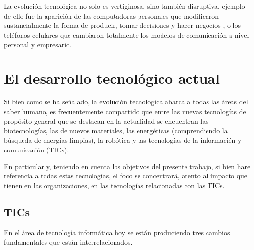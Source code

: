 \documentclass[a4paper, 12pt]{article}
\begin{document}
La evolución tecnológica no solo es vertiginosa, sino también disruptiva, ejemplo de ello fue la aparición de las computadoras personales que modificaron sustancialmente la forma de producir, tomar decisiones y hacer negocios , o los teléfonos celulares que cambiaron totalmente los modelos de comunicación a nivel personal y empresario.

\section{El desarrollo tecnológico actual}
\label{sec:DesarrolloTecnologicoActual}
Si bien como se ha señalado, la evolución tecnológica abarca a todas las áreas del saber humano, es frecuentemente compartido que entre las nuevas tecnologías de propósito general que se destacan en la actualidad se encuentran las biotecnologías, las de nuevos materiales, las energéticas (comprendiendo la búsqueda de energías limpias), la robótica y las tecnologías de la información y comunicación (TICs).

En particular y, teniendo en cuenta los objetivos del presente trabajo, si bien hare referencia a todas estas tecnologías, el foco se concentrará, atento al impacto que tienen en las organizaciones, en las tecnologías relacionadas con las TICs.

\subsection{TICs}
\label{TICS}
En el área de tecnología informática hoy se están produciendo tres cambios fundamentales que están interrelacionados.
\end{document}
